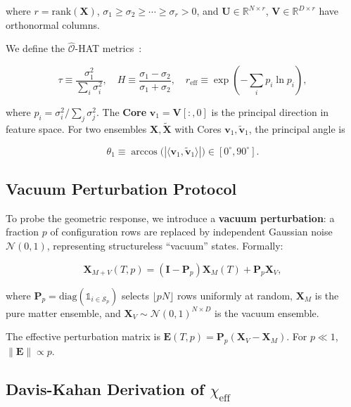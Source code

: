\documentclass[aps,prl,twocolumn,superscriptaddress,byrevtex]{article}
\begin{document}
where $r = \text{rank}(\mathbf{X})$, $\sigma_1 \geq \sigma_2 \geq \cdots \geq \sigma_r > 0$, and $\mathbf{U} \in \mathbb{R}^{N \times r}$, $\mathbf{V} \in \mathbb{R}^{D \times r}$ have orthonormal columns.

We define the $\hat{\mathcal{O}}$-HAT metrics~\cite{dr2026ohat}:

\begin{equation}
\tau \equiv \frac{\sigma_1^2}{\sum_i \sigma_i^2}, \quad
H \equiv \frac{\sigma_1 - \sigma_2}{\sigma_1 + \sigma_2}, \quad
r_{\text{eff}} \equiv \exp\!\left(-\sum_i p_i \ln p_i\right),
\label{eq:ohat_metrics}
\end{equation}

where $p_i = \sigma_i^2 / \sum_j \sigma_j^2$. The \textbf{Core} $\mathbf{v}_1 = \mathbf{V}[:,0]$ is the principal direction in feature space. For two ensembles $\mathbf{X}, \tilde{\mathbf{X}}$ with Cores $\mathbf{v}_1, \tilde{\mathbf{v}}_1$, the principal angle is

\begin{equation}
\theta_1 \equiv \arccos\!\big(|\langle\mathbf{v}_1, \tilde{\mathbf{v}}_1\rangle|\big) \in [0^\circ, 90^\circ].
\label{eq:theta1}
\end{equation}

\subsection{Vacuum Perturbation Protocol}

To probe the geometric response, we introduce a \textbf{vacuum perturbation}: a fraction $p$ of configuration rows are replaced by independent Gaussian noise $\mathcal{N}(0,1)$, representing structureless ``vacuum'' states. Formally:

\begin{equation}
\mathbf{X}_{M+V}(T, p) = (\mathbf{I} - \mathbf{P}_p)\mathbf{X}_M(T) + \mathbf{P}_p\mathbf{X}_V,
\label{eq:perturbed}
\end{equation}

where $\mathbf{P}_p = \text{diag}(\mathbb{1}_{i \in \mathcal{S}_p})$ selects $\lfloor pN\rfloor$ rows uniformly at random, $\mathbf{X}_M$ is the pure matter ensemble, and $\mathbf{X}_V \sim \mathcal{N}(0,1)^{N \times D}$ is the vacuum ensemble.

The effective perturbation matrix is $\mathbf{E}(T, p) = \mathbf{P}_p(\mathbf{X}_V - \mathbf{X}_M)$. For $p \ll 1$, $\|\mathbf{E}\| \propto p$.

\subsection{Davis-Kahan Derivation of \texorpdfstring{$\chi_{\text{eff}}$}{χ\_eff}}
\end{document}
